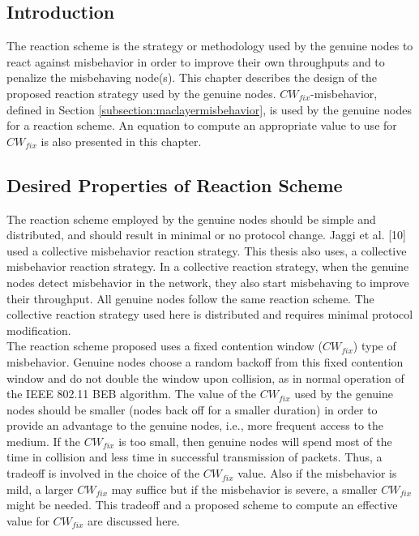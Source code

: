 \documentclass[12pt,letterpaper,english]{article}
\begin{document}
\subsection{Introduction}
\indent The reaction scheme is the strategy or methodology used by the genuine nodes to react against misbehavior in order to improve their own throughputs and to penalize the misbehaving node(s). This chapter describes the design of the proposed reaction strategy used by the genuine nodes. $CW_{fix}$-misbehavior, defined in Section \ref{subsection:maclayermisbehavior}, is used by the genuine nodes for a reaction scheme. An equation to compute an appropriate value to use for $CW_{fix}$ is also presented in this chapter.
\subsection{Desired Properties of Reaction Scheme}
\label{subsection:propertiesofreaction}
\indent The reaction scheme employed by the genuine nodes should be simple and distributed, and should result in minimal or no protocol change. 
Jaggi et al. 
[10] 
used a collective misbehavior reaction strategy. This thesis also uses, a collective misbehavior reaction strategy.
In a collective reaction strategy, when the genuine nodes detect misbehavior in the network, they also start misbehaving to improve their throughput. All genuine nodes follow the same reaction scheme.
The collective reaction strategy used here is distributed and requires minimal protocol modification.\\
\indent The reaction scheme proposed uses a fixed contention window ($CW_{fix}$) type of misbehavior. Genuine nodes choose a random backoff from this fixed contention window and do not double the window upon collision, as in normal operation of the IEEE 802.11 BEB algorithm. The value of the $CW_{fix}$ used by the genuine nodes should be smaller (nodes back off for a smaller duration) in order to provide an advantage to the genuine nodes, i.e., more frequent access to the medium. If the $CW_{fix}$ is too small, then genuine nodes will spend most of the time in collision and less time in successful transmission of packets. Thus, a tradeoff is involved in the choice of the $CW_{fix}$ value. Also if the misbehavior is mild, a larger $CW_{fix}$ may suffice but if the misbehavior is severe, a smaller $CW_{fix}$ might be needed. This tradeoff and a proposed scheme to compute an effective value for $CW_{fix}$ are discussed here.
\end{document}
